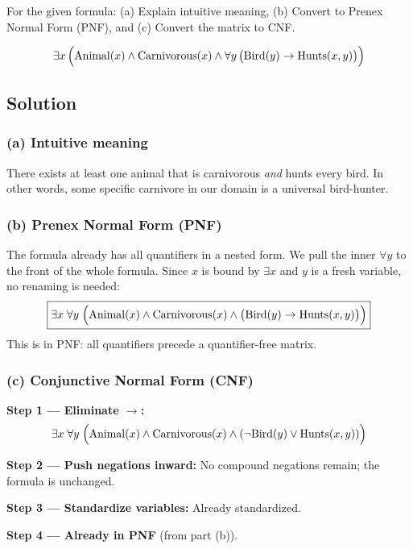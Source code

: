 \documentclass[11pt,a4paper]{article}
\newenvironment{solution}{%
    \begin{tcolorbox}[
        breakable,
        colback=green!4,
        colframe=green!50!black,
        fonttitle=\bfseries,
        title={ Solution},
        left=6pt, right=6pt, top=4pt, bottom=4pt
    ]%
    }{%
    \end{tcolorbox}%
}
\newcommand{\fall}[1]{\forall #1\,}
\newcommand{\fex}[1]{\exists #1\,}
\begin{document}
    For the given formula: (a) Explain intuitive meaning, (b) Convert to Prenex Normal Form (PNF), and (c) Convert the matrix to CNF.

    \[
        \fex{x}\Bigl(\mathrm{Animal}(x) \land \mathrm{Carnivorous}(x)
        \land \fall{y}\bigl(\mathrm{Bird}(y) \to \mathrm{Hunts}(x,y)\bigr)\Bigr)
    \]
    \subsection*{Solution}
    \begin{solution}
        \subsubsection*{(a) Intuitive meaning}
        There exists at least one animal that is carnivorous \emph{and} hunts every bird. In other words, some specific carnivore in our domain is a universal bird-hunter.

        \subsubsection*{(b) Prenex Normal Form (PNF)}
        The formula already has all quantifiers in a nested form. We pull the inner $\forall y$ to the front of the whole formula. Since $x$ is bound by $\exists x$ and $y$ is a fresh variable, no renaming is needed:
        \[
            \boxed{\exists x\;\forall y\;\Bigl(\mathrm{Animal}(x) \land \mathrm{Carnivorous}(x) \land \bigl(\mathrm{Bird}(y) \to \mathrm{Hunts}(x,y)\bigr)\Bigr)}
        \]
        This is in PNF: all quantifiers precede a quantifier-free matrix.

        \subsubsection*{(c) Conjunctive Normal Form (CNF)}

        \textbf{Step 1 — Eliminate $\to$:}
        \[
            \exists x\;\forall y\;\Bigl(\mathrm{Animal}(x) \land \mathrm{Carnivorous}(x) \land (\neg\mathrm{Bird}(y) \lor \mathrm{Hunts}(x,y))\Bigr)
        \]

        \textbf{Step 2 — Push negations inward:} No compound negations remain; the formula is unchanged.

        \textbf{Step 3 — Standardize variables:} Already standardized.

        \textbf{Step 4 — Already in PNF} (from part (b)).


\end{solution}
\end{document}
